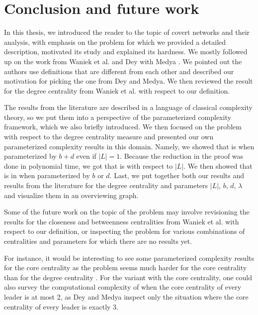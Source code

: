 \chapter{Conclusion and future work}

In this thesis, we introduced the reader to the topic of covert networks and their analysis,
with emphasis on the \HL problem for which we provided a detailed description, motivated its study
and explained its hardness.
We mostly followed up on the work from Waniek et al. and Dey with Medya \cite{Waniek2017,Dey2019}.
We pointed out the authors use definitions that are different from each other and described our motivation
for picking the one from Dey and Medya.
We then reviewed the result for the degree centrality from Waniek et al. with respect to our definition.

The results from the literature are described in a language of classical complexity theory,
so we put them into a perspective of the parameterized complexity framework, which we also briefly introduced.
We then focused on the problem with respect to the degree centrality measure
and presented our own parameterized complexity results in this domain.
Namely, we showed that \HL is \Wh when parameterized by $b+d$ even if $|L| = 1$.
Because the reduction in the proof was done in polynomial time,
we got that \HLshort is \pNPh with respect to $|L|$.
We then showed that \HLshort is in \XP when parameterized by $b$ or $d$.
Last, we put together both our results and results from the literature for the degree centrality
and parameters $|L|$, $b$, $d$, $\lambda$ and visualize them in an overviewing graph.

Some of the future work on the topic of the \HL problem may involve
revisioning the results for the closeness and betweenness centralities from Waniek et al. \cite{Waniek2021full}
with respect to our definition,
or inspecting the problem for various combinations of centralities and parameters for which there are no results yet.

For instance, it would be interesting to see some parameterized complexity results for the core centrality
as the problem seems much harder for the core centrality than for the degree centrality \cite{Dey2019}.
For the variant with the core centrality, one could also survey the computational complexity of \HLshort
when the core centrality of every leader is at most 2,
as Dey and Medya \cite{Dey2019} inspect only the situation where the core centrality of every leader is exactly 3.

